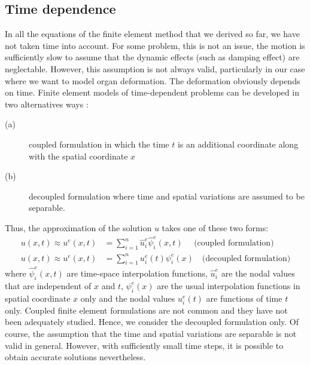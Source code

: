 	\subsection{Time dependence}
In all the equations of the finite element method that we derived so far, we have not taken time into account. For some problem, this is not an issue, the motion is sufficiently slow to assume that the dynamic effects (such as damping effect) are neglectable. However, this assumption is not always valid, particularly in our case where we want to model organ deformation. The deformation obviously depends on time. Finite element models of time-dependent problems can be developed in two alternatives ways \citep{Reddy93}:
\begin{description}
\item[(a)] coupled formulation in which the time $ t $ is an additional coordinate along with the spatial coordinate $ x $
\item[(b)] decoupled formulation where time and spatial variations are assumed to be separable.
\end{description}
Thus, the approximation of the solution $ u $ takes one of these two forms:
\begin{align}
u(x, t) \approx u^e(x, t) &= \sum_{i=1}^n \hat{u}^e_i \hat{\psi}^e_i(x, t)  \quad \text{ (coupled formulation)} \label{chap3:approxTime1}\\
u(x, t) \approx u^e(x, t) &= \sum_{i=1}^n u^e_i(t) \psi^e_i(x) \quad \text{(decoupled formulation)} \label{chap3:approxTime2}
\end{align}
where $ \hat{\psi}^e_i(x, t) $ are time-space interpolation functions, $ \hat{u}^e_i $ are the nodal values that are independent of $ x $ and $ t $, $ \psi^e_i(x) $ are the usual interpolation functions in spatial coordinate $ x $ only and the nodal values $ u^e_i(t) $ are functions of time $ t $ only. Coupled finite element formulations are not common and they have not been adequately studied. Hence, we consider the decoupled formulation only. Of course, the assumption that the time and spatial variations are separable is not valid in general. However, with sufficiently small time steps, it is possible to obtain accurate solutions nevertheless. 

	
